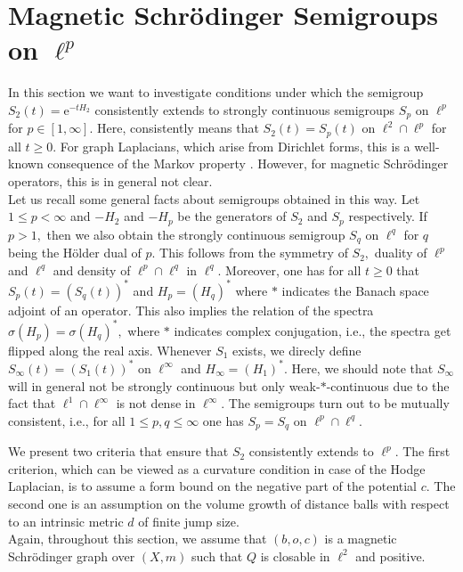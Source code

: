 \documentclass[10pt]{amsart}
\theoremstyle{definition}
\begin{document}
\section{Magnetic Schrödinger Semigroups on $\ell^p$}\label{s:semigroupsonlp}
In this section we want to investigate conditions under which the semigroup $S_2(t)=\mathrm{e}^{-tH_2}$ consistently extends to strongly continuous semigroups $S_p$ on $\ell^p$ for $p\in[1,\infty].$ Here, consistently means that $S_2(t) = S_p(t)$ on $\ell^2\cap\ell^p$ for all $t\geq 0.$ For graph Laplacians, which arise from Dirichlet forms, this is a well-known consequence of the Markov property \cite{DaviesLinOp, KLW}. However, for magnetic Schrödinger operators, this is in general not clear.\\
Let us recall some general facts about semigroups obtained in this way. Let $1\leq p<\infty$ and $-H_2$ and $-H_p$ be the generators of $S_2$ and $S_p$ respectively. If $p>1,$ then we also obtain  the strongly continuous semigroup $S_q$ on $\ell^q$ for $q$ being the H\"older dual of $p.$ This follows from the symmetry of $S_2,$ duality of $\ell^p$ and $\ell^q$ and density of $\ell^p\cap\ell^q$ in $\ell^q.$ Moreover, one has for all $t\geq 0$ that $S_p(t) = (S_q(t))^*$ and $H_p = (H_q)^*$ where $\ast$ indicates the Banach space adjoint of an operator. This also implies the relation of the spectra $\sigma(H_p) = \sigma(H_q)^*,$ where $\ast$ indicates complex conjugation, i.e., the spectra get flipped along the real axis. Whenever $S_1$ exists, we direcly define $S_\infty(t) = (S_1(t))^* $ on $\ell^\infty$ and $H_\infty = (H_1)^*.$ Here, we should note that $S_\infty$ will in general not be strongly continuous but only weak-$\ast$-continuous due to the fact that $\ell^1\cap\ell^\infty$ is not dense in $\ell^\infty.$ The semigroups turn out to be mutually consistent, i.e., for all $1\leq p,q\leq\infty$ one has $S_p = S_q$ on $\ell^p\cap\ell^q.$



We present two criteria that ensure  that $S_2$ consistently extends to $\ell^p.$ The first criterion, which can be viewed as a curvature condition in case of the Hodge Laplacian, is to assume a form bound on the negative part of the potential $c$. The second one is an assumption on the volume growth of distance balls with respect to an intrinsic metric $d$ of finite jump size.\\
Again, throughout this section, we assume that $(b,o,c)$ is a magnetic Schrödinger graph over $(X,m)$ such that $Q$ is closable in $\ell^2$ and positive.%
\end{document}
